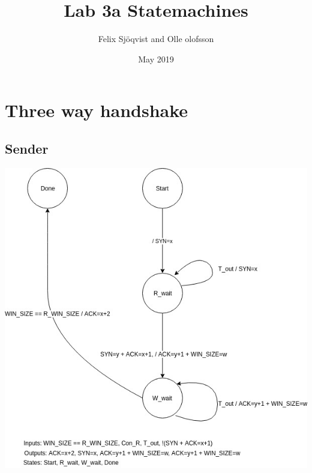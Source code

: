 \documentclass{article}
\title{Lab 3a Statemachines}
\author{Felix Sjöqvist and Olle olofsson }
\date{May 2019}
\begin{document}
\maketitle

\section{Three way handshake}
\subsection{Sender}
\includegraphics[scale=0.6]{TWH_S.jpg}
\end{document}
